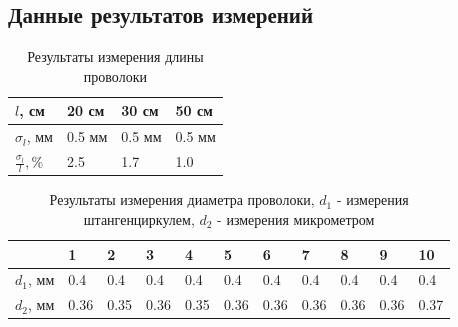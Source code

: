 \documentclass{article}
\begin{document}
\subsection{Данные результатов измерений}\label{sec:app_3}
\begin{table}[H]
    \label{tab:2}
    \begin{center}
        \begin{tabular}{|l|l|l|l|}
            \hline
            $l$, см                  & 20 см  & 30 см  & 50 см  \\
            \hline
            $\sigma_l$, мм           & 0.5 мм & 0.5 мм & 0.5 мм \\
            \hline
            $\frac{\sigma_l}{l}, \%$ & 2.5    & 1.7    & 1.0    \\
            \hline
        \end{tabular}
    \end{center}
    \caption{Результаты измерения длины проволоки}
\end{table}
\begin{table}[H]
    \label{tab:3}
    \begin{center}
        \begin{tabular}{|l|l|l|l|l|l|l|l|l|l|l|}
            \hline
                      & 1    & 2    & 3    & 4    & 5    & 6    & 7    & 8    & 9    & 10   \\
            \hline
            $d_1$, мм & 0.4  & 0.4  & 0.4  & 0.4  & 0.4  & 0.4  & 0.4  & 0.4  & 0.4  & 0.4  \\
            $d_2$, мм & 0.36 & 0.35 & 0.36 & 0.35 & 0.36 & 0.36 & 0.36 & 0.36 & 0.36 & 0.37 \\
            \hline
        \end{tabular}
    \end{center}
    \caption{Результаты измерения диаметра проволоки, $d_1$ - измерения штангенциркулем, $d_2$ - измерения микрометром}
\end{table}
\end{document}
